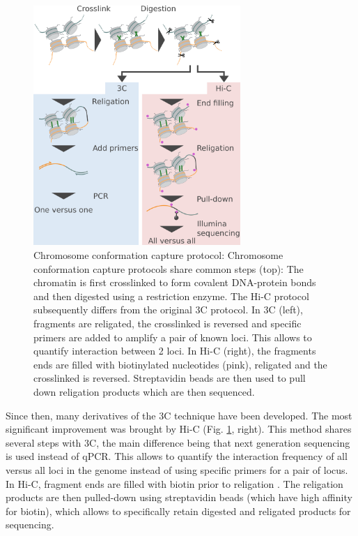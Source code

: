 \begin{figure}[htb]
    \centering
    \includegraphics[width=0.7\textwidth]{Parts/Part01/gfx/3c_protocol.pdf}
    \caption[Chromosome conformation capture protocol.]{Chromosome conformation capture protocol: Chromosome conformation capture protocols share common steps (top): The chromatin is first crosslinked to form covalent DNA-protein bonds and then digested using a restriction enzyme. The Hi-C protocol subsequently differs from the original 3C protocol. In 3C (left), fragments are religated, the crosslinked is reversed and specific primers are added to amplify a pair of known loci. This allows to quantify interaction between 2 loci. In Hi-C (right), the fragments ends are filled with biotinylated nucleotides (pink), religated and the crosslinked is reversed. Streptavidin beads are then used to pull down religation products which are then sequenced.}
	\label{fig:01-02:3c}
\end{figure}

Since then, many derivatives of the \acrshort{3C} technique have been developed. The most significant improvement was brought by Hi-C (Fig. \ref{fig:01-02:3c}, right). This method shares several steps with 3C, the main difference being that next generation sequencing is used instead of qPCR. This allows to quantify the interaction frequency of all versus all loci in the genome instead of using specific primers for a pair of locus. In Hi-C, fragment ends are filled with biotin prior to religation \cite{lieberman-aidenComprehensiveMappingLongRange2009}. The religation products are then pulled-down using streptavidin beads (which have high affinity for biotin), which allows to specifically retain digested  and religated products for sequencing.

